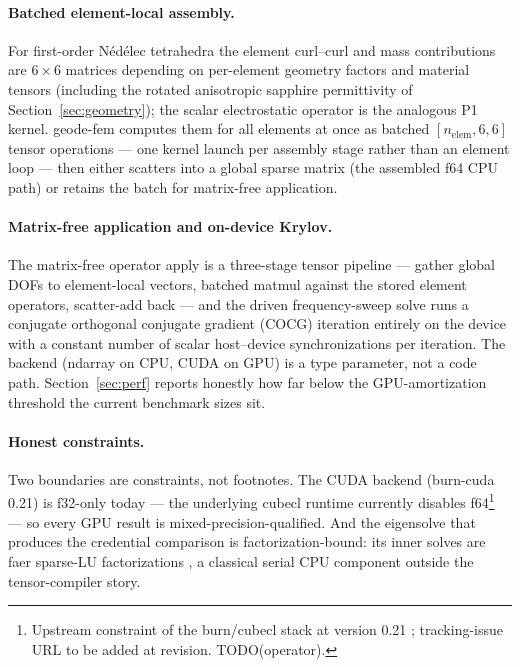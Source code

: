 \documentclass{anvil-paper}
\begin{document}
\paragraph{Batched element-local assembly.}
For first-order N\'ed\'elec tetrahedra the element curl--curl and mass
contributions are $6\times 6$ matrices depending on per-element geometry
factors and material tensors (including the rotated anisotropic sapphire
permittivity of Section~\ref{sec:geometry}); the scalar electrostatic
operator is the analogous P1 kernel. geode-fem computes them for all
elements at once as batched $[n_{\mathrm{elem}},6,6]$ tensor operations
--- one kernel launch per assembly stage rather than an element loop ---
then either scatters into a global sparse matrix (the assembled f64 CPU
path) or retains the batch for matrix-free application.

\paragraph{Matrix-free application and on-device Krylov.}
The matrix-free operator apply is a three-stage tensor pipeline ---
gather global DOFs to element-local vectors, batched matmul against the
stored element operators, scatter-add back --- and the driven
frequency-sweep solve runs a conjugate orthogonal conjugate gradient
(COCG) iteration entirely on the device with a constant number of scalar
host--device synchronizations per iteration. The backend (ndarray on CPU,
CUDA on GPU) is a type parameter, not a code path.
Section~\ref{sec:perf} reports honestly how far below the
GPU-amortization threshold the current benchmark sizes sit.

\paragraph{Honest constraints.}
Two boundaries are constraints, not footnotes. The CUDA backend
(burn-cuda 0.21) is f32-only today --- the underlying cubecl runtime
currently disables f64\footnote{Upstream constraint of the burn/cubecl
stack at version 0.21 \citep{burn}; tracking-issue URL to be added at
revision. TODO(operator).} --- so every GPU result is
mixed-precision-qualified. And the eigensolve that produces the
credential comparison is factorization-bound: its inner solves are faer
sparse-LU factorizations \citep{kazdadi2026faer}, a classical serial CPU
component outside the tensor-compiler story.
\end{document}
